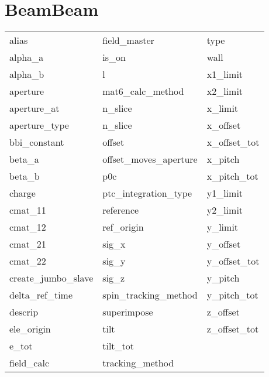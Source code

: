  \section{BeamBeam}
 \label{s:list.beambeam}
 
 \begin{tabular}{lll} \toprule
alias                       & field_master                & type                        \\
alpha_a                     & is_on                       & wall                        \\
alpha_b                     & l                           & x1_limit                    \\
aperture                    & mat6_calc_method            & x2_limit                    \\
aperture_at                 & n_slice                     & x_limit                     \\
aperture_type               & n_slice                     & x_offset                    \\
bbi_constant                & offset                      & x_offset_tot                \\
beta_a                      & offset_moves_aperture       & x_pitch                     \\
beta_b                      & p0c                         & x_pitch_tot                 \\
charge                      & ptc_integration_type        & y1_limit                    \\
cmat_11                     & reference                   & y2_limit                    \\
cmat_12                     & ref_origin                  & y_limit                     \\
cmat_21                     & sig_x                       & y_offset                    \\
cmat_22                     & sig_y                       & y_offset_tot                \\
create_jumbo_slave          & sig_z                       & y_pitch                     \\
delta_ref_time              & spin_tracking_method        & y_pitch_tot                 \\
descrip                     & superimpose                 & z_offset                    \\
ele_origin                  & tilt                        & z_offset_tot                \\
e_tot                       & tilt_tot                    &                             \\
field_calc                  & tracking_method             &                             \\
 \bottomrule
 \end{tabular}
 \vfill
 
